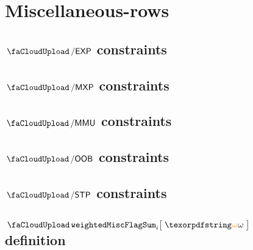 \section{Miscellaneous-rows}
\subsection{$\miscSignifier\separator\expMod$  constraints \lispDone{}}  \label{hub: miscellaneous constraints: exp}                
\subsection{$\miscSignifier\separator\mxpMod$  constraints \lispDone{}}  \label{hub: miscellaneous constraints: mxp}                
\subsection{$\miscSignifier\separator\mmuMod$  constraints \lispDone{}}  \label{hub: miscellaneous constraints: mmu}                
\subsection{$\miscSignifier\separator\oobMod$  constraints \lispDone{}}  \label{hub: miscellaneous constraints: oob}                
\subsection{$\miscSignifier\separator\stpMod$  constraints \lispDone{}}  \label{hub: miscellaneous constraints: stp}                
\subsection{$\weightedMiscFlagSum {i}{\relof}$ definition  \lispDone{}}  \label{hub: miscellaneous constraints: weighted flag sum}  
